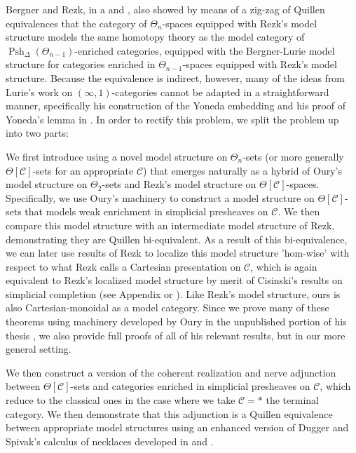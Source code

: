 \documentclass[a4paper]{article}
\numberwithin{equation}{subsection}
\theoremstyle{plain}   %
\theoremstyle{definition}
\theoremstyle{remark}
\theoremstyle{plain}
\DeclareMathOperator{\Psh}{Psh}
\providecommand{\C}{}
\renewcommand{\C}{\ensuremath{\mathcal{C}}}
\begin{document}
Bergner and Rezk, in a \cite{bergner-rezk-1} and \cite{bergner-rezk-2}, also showed by means of a zig-zag of Quillen equivalences that the category of \(\Theta_n\)-spaces equipped with Rezk's model structure models the same homotopy theory as the model category of \(\Psh_\Delta(\Theta_{n-1})\)-enriched categories, equipped with the Bergner-Lurie model structure for categories enriched in \(\Theta_{n-1}\)-spaces equipped with Rezk's model structure.  Because the equivalence is indirect, however, many of the ideas from Lurie's work on \((\infty,1)\)-categories cannot be adapted in a straightforward manner, specifically his construction of the Yoneda embedding and his proof of Yoneda's lemma in \cite{htt}.  In order to rectify this problem, we split the problem up into two parts: 

We first introduce using a novel model structure on \(\Theta_n\)-sets (or more generally \(\Theta[\C]\)-sets for an appropriate \(\C\)) that emerges naturally as a hybrid of Oury's model structure on \(\Theta_2\)-sets and Rezk's model structure on \(\Theta[\C]\)-spaces.  Specifically, we use Oury's machinery to construct a model structure on \(\Theta[\C]\)-sets that models weak enrichment in simplicial presheaves on \(\C\). We then compare this model structure with an intermediate model structure of Rezk, demonstrating they are Quillen bi-equivalent.  As a result of this bi-equivalence, we can later use results of Rezk \cite{rezk-theta-n-spaces} to localize this model structure 'hom-wise' with respect to what Rezk calls a Cartesian presentation on \(\C\), which is again equivalent to Rezk's localized model structure by merit of Cisinski's results on simplicial completion (see Appendix or \cite{cisinski-book}).  Like Rezk's model structure, ours is also Cartesian-monoidal as a model category. Since we prove many of these theorems using machinery developed by Oury in the unpublished portion of his thesis \cite{oury}, we also provide full proofs of all of his relevant results, but in our more general setting.

We then construct a version of the coherent realization and nerve adjunction between \(\Theta[\C]\)-sets and categories enriched in simplicial presheaves on \(\C\), which reduce to the classical ones in the case where we take \(\C=\ast\) the terminal category. We then demonstrate that this adjunction is a Quillen equivalence between appropriate model structures using an enhanced version of Dugger and Spivak's calculus of necklaces developed in \cite{ds1} and \cite{ds2}. 
\end{document}
